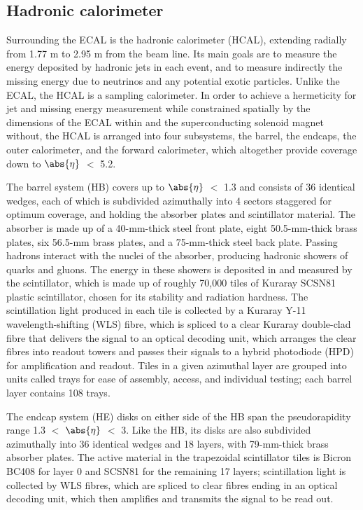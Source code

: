 \subsection{Hadronic calorimeter\label{sec:cms-hcal}}

Surrounding the ECAL is the hadronic calorimeter (HCAL), extending radially from 1.77 m to 2.95 m from the beam line. Its main goals are to measure the energy deposited by hadronic jets in each event, and to measure indirectly the missing energy due to neutrinos and any potential exotic particles. Unlike the ECAL, the HCAL is a sampling calorimeter. In order to achieve a hermeticity for jet and missing energy measurement while constrained spatially by the dimensions of the ECAL within and the superconducting solenoid magnet without, the HCAL is arranged into four subsystems, the barrel, the endcaps, the outer calorimeter, and the forward calorimeter, which altogether provide coverage down to $\abs{\eta}$ $<$ 5.2.

The barrel system (HB) covers up to $\abs{\eta}$ $<$ 1.3 and consists of 36 identical wedges, each of which is subdivided azimuthally into 4 sectors staggered for optimum coverage, and holding the absorber plates and scintillator material. The absorber is made up of a 40-mm-thick steel front plate, eight 50.5-mm-thick brass plates, six 56.5-mm brass plates, and a 75-mm-thick steel back plate. Passing hadrons interact with the nuclei of the absorber, producing hadronic showers of quarks and gluons. The energy in these showers is deposited in and measured by the scintillator, which is made up of roughly 70,000 tiles of Kuraray SCSN81 plastic scintillator, chosen for its stability and radiation hardness. The scintillation light produced in each tile is collected by a Kuraray Y-11 wavelength-shifting (WLS) fibre, which is spliced to a clear Kuraray double-clad fibre that delivers the signal to an optical decoding unit, which arranges the clear fibres into readout towers and passes their signals to a hybrid photodiode (HPD) for amplification and readout. Tiles in a given azimuthal layer are grouped into units called trays for ease of assembly, access, and individual testing; each barrel layer contains 108 trays.

The endcap system (HE) disks on either side of the HB span the pseudorapidity range 1.3 $<$ $\abs{\eta}$ $<$ 3. Like the HB, its disks are also subdivided azimuthally into 36 identical wedges and 18 layers, with 79-mm-thick brass absorber plates. The active material in the trapezoidal scintillator tiles is Bicron BC408 for layer 0 and SCSN81 for the remaining 17 layers; scintillation light is collected by WLS fibres, which are spliced to clear fibres ending in an optical decoding unit, which then amplifies and transmits the signal to be read out.

